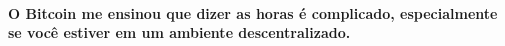 \paragraph{O Bitcoin me ensinou que dizer as horas é complicado, especialmente se você estiver em um ambiente descentralizado.}

%
%
%
%
%
%
%
